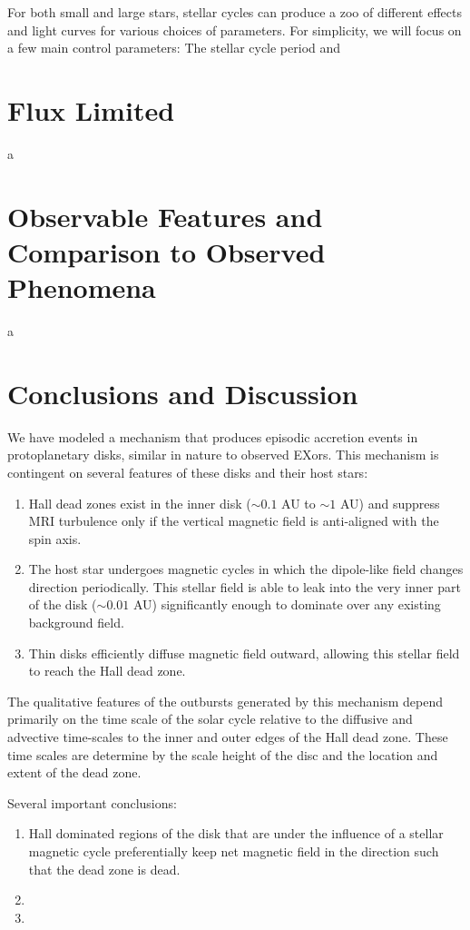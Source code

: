 For both small and large stars, stellar cycles can produce a zoo of different effects and light curves for various choices of parameters. For simplicity, we will focus on a few main control parameters: The stellar cycle period and 


 
 
\newpage
\section{Flux Limited}
a




\newpage
\section{Observable Features and Comparison to Observed Phenomena}
a




\newpage
\section{Conclusions and Discussion}
We have modeled a mechanism that produces episodic accretion events in protoplanetary disks, similar in nature to observed EXors.  This mechanism is contingent on several features of these disks and their host stars:
\begin{enumerate}
\item{Hall dead zones exist in the inner disk ($\sim 0.1$ AU to $\sim 1$ AU) and suppress MRI turbulence only if the vertical magnetic field is anti-aligned with the spin axis. }
\item{The host star undergoes magnetic cycles in which the dipole-like field changes direction periodically.  This stellar field is able to leak into the very inner part of the disk ($\sim 0.01$ AU) significantly enough to dominate over any existing background field.}
\item{Thin disks efficiently diffuse magnetic field outward, allowing this stellar field to reach the Hall dead zone.}
\end{enumerate}

The qualitative features of the outbursts generated by this mechanism depend primarily on the time scale of the solar cycle relative to the diffusive and advective time-scales to the inner and outer edges of the Hall dead zone.  These time scales are determine by the scale height of the disc and the location and extent of the dead zone.

Several important conclusions:
\begin{enumerate}
\item{Hall dominated regions of the disk that are under the influence of a stellar magnetic cycle preferentially keep net magnetic field in the direction such that the dead zone is dead.}
\item{}
\item{}
\end{enumerate}
















